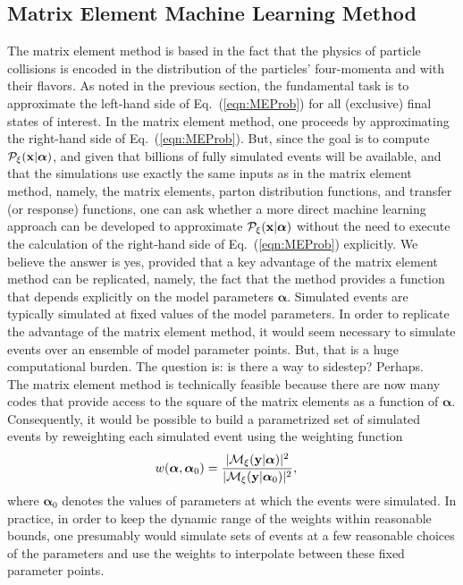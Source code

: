 \subsection{Matrix Element Machine Learning Method}
The matrix element method is based in the fact that the physics of particle collisions is encoded in the distribution of the particles' four-momenta and with their flavors. As noted in the previous section, the fundamental task is to approximate the left-hand side of Eq.~(\ref{eqn:MEProb}) for all (exclusive) final states of interest. In the matrix element method, one proceeds by approximating the right-hand side of Eq.~(\ref{eqn:MEProb}). But, since the goal is to compute $\mathcal{P}_{\xi}({\bf x}|{\boldsymbol\alpha})$, and given that billions of fully simulated events will be available, and that the simulations use exactly the same inputs as in the matrix element method, namely, the matrix elements, parton distribution functions, and transfer (or response) functions, one can ask whether a more direct machine learning approach can be developed to approximate  $\mathcal{P}_{\xi}({\bf x}|{\boldsymbol\alpha})$ without the need to execute the calculation of the right-hand side of Eq.~(\ref{eqn:MEProb}) explicitly. We believe the answer is yes, provided that a key advantage of the matrix element method can be replicated, namely, the fact that the method provides a function that depends explicitly on the model parameters ${\boldsymbol\alpha}$. Simulated events are typically simulated at fixed values of the model parameters. In order to replicate the advantage of the matrix element method, it would seem necessary to simulate events over an ensemble of model parameter points. But, that is a huge computational burden. The question is: is there a way to sidestep? Perhaps.\\

The matrix element method is technically feasible because there are now many codes that provide access to the square of the matrix elements as a function of ${\boldsymbol\alpha}$. Consequently, it would be possible to build a parametrized set of simulated events by reweighting each simulated event using the weighting function
\begin{align}
 w(\boldsymbol{\alpha}, \boldsymbol{\alpha}_0) & = \frac{|\mathcal{M}_{\xi}({\bf y}|\boldsymbol\alpha)|^2}{|\mathcal{M}_{\xi}({\bf y}|\boldsymbol\alpha_0)|^2},
\end{align}
where $\boldsymbol{\alpha}_0$ denotes the values of parameters at which the events were simulated. In practice, in order to keep the dynamic range of the weights within reasonable bounds, one presumably would simulate sets of events at a few reasonable choices of the parameters and use the weights to interpolate between these fixed parameter points.\\

